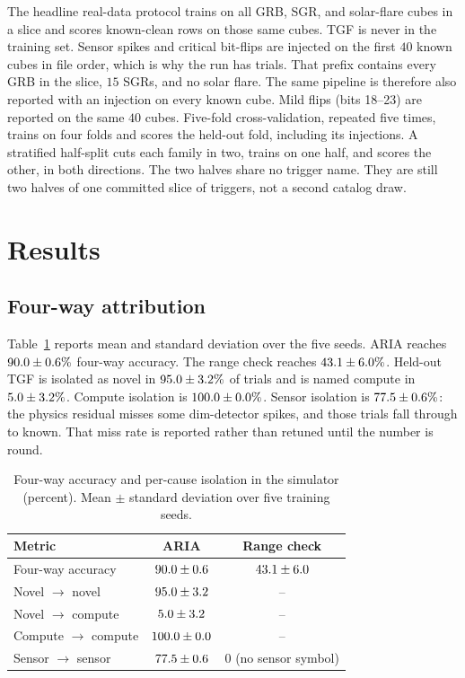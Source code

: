 \documentclass[preprint,12pt]{elsarticle}
\begin{document}
The headline real-data protocol trains on all GRB, SGR, and solar-flare cubes in a slice and scores known-clean rows on those same cubes. TGF is never in the training set. Sensor spikes and critical bit-flips are injected on the first $40$ known cubes in file order, which is why the run has \RealTrials{} trials. That prefix contains every GRB in the slice, $15$ SGRs, and no solar flare. The same pipeline is therefore also reported with an injection on every known cube. Mild flips (bits 18--23) are reported on the same $40$ cubes. Five-fold cross-validation, repeated five times, trains on four folds and scores the held-out fold, including its injections. A stratified half-split cuts each family in two, trains on one half, and scores the other, in both directions. The two halves share no trigger name. They are still two halves of one committed slice of \RealCubes{} triggers, not a second catalog draw.

\section{Results}
\label{sec:results}

\subsection{Four-way attribution}

Table~\ref{tab:main} reports mean and standard deviation over the five seeds. ARIA reaches $90.0\pm0.6\%$ four-way accuracy. The range check reaches $43.1\pm6.0\%$. Held-out TGF is isolated as novel in $95.0\pm3.2\%$ of trials and is named compute in $5.0\pm3.2\%$. Compute isolation is $100.0\pm0.0\%$. Sensor isolation is $77.5\pm0.6\%$: the physics residual misses some dim-detector spikes, and those trials fall through to known. That miss rate is reported rather than retuned until the number is round.

\begin{table}[t]
\caption{Four-way accuracy and per-cause isolation in the simulator (percent). Mean $\pm$ standard deviation over five training seeds.}
\label{tab:main}
\centering
\begin{tabular}{lcc}
\toprule
Metric & ARIA & Range check \\
\midrule
Four-way accuracy & $90.0\pm0.6$ & $43.1\pm6.0$ \\
Novel $\to$ novel & $95.0\pm3.2$ & -- \\
Novel $\to$ compute & $5.0\pm3.2$ & -- \\
Compute $\to$ compute & $100.0\pm0.0$ & -- \\
Sensor $\to$ sensor & $77.5\pm0.6$ & 0 (no sensor symbol) \\
\bottomrule
\end{tabular}
\end{table}
\end{document}
